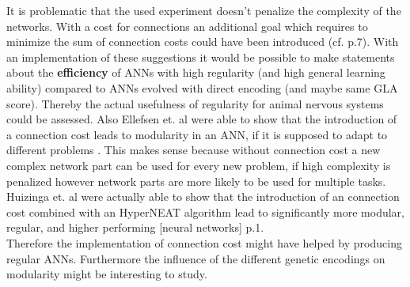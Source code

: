 \documentclass[12pt,twoside]{article}
\theoremstyle{plain}
\theoremstyle{definition}
\theoremstyle{remark}
\begin{document}
It is problematic that the used experiment doesn't penalize the complexity of the networks. With a cost for connections an additional goal which requires to minimize the sum of connection costs could have been introduced (cf. \cite{citeulike:12788284} p.7).
With an implementation of these suggestions it would be possible to make statements about the \textbf{efficiency} of ANNs with high regularity (and high general learning ability) compared to ANNs evolved with direct encoding (and maybe same GLA score).
Thereby the actual usefulness of regularity for animal nervous systems could be assessed.
Also Ellefsen et. al were able to show that the introduction of a connection cost leads to modularity in an ANN, if it is supposed to adapt to different problems \cite{ellefsen2015neural}. This makes sense because without connection cost a new complex network part can be used for every new problem, if high complexity is penalized however network parts are more likely to be used for multiple tasks.
Huizinga et. al were actually able to show that the introduction of an connection cost combined with an HyperNEAT algorithm lead to \glqq significantly more modular, regular, and higher performing [neural networks]\grqq \cite{huizinga2014evolving} p.1.\\
Therefore the implementation of connection cost might have helped by producing regular ANNs. Furthermore the influence of the different genetic encodings on modularity might be interesting to study.


\end{document}
